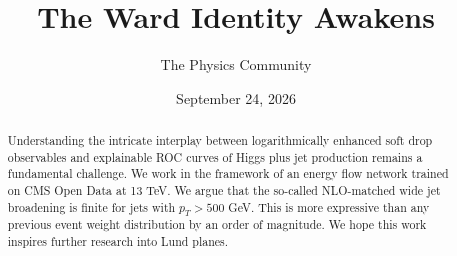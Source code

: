 \documentclass[11pt]{article}
\title{The Ward Identity Awakens}
\author{The Physics Community}
\date{September 24, 2026}
\numberwithin{equation}{section}
\theoremstyle{definition}
\theoremstyle{remark}
\begin{document}
\maketitle
\begin{abstract}
Understanding the intricate interplay between logarithmically enhanced
soft drop observables and explainable ROC curves of Higgs plus jet
production remains a fundamental challenge. We work in the framework of
an energy flow network trained on CMS Open Data at 13 TeV. We argue that
the so-called NLO-matched wide jet broadening is finite for jets with
$p_T > 500$ GeV. This is more expressive than any previous event weight
distribution by an order of magnitude. We hope this work inspires
further research into Lund planes.
\end{abstract}
\tableofcontents





\nocite{*}


\end{document}
